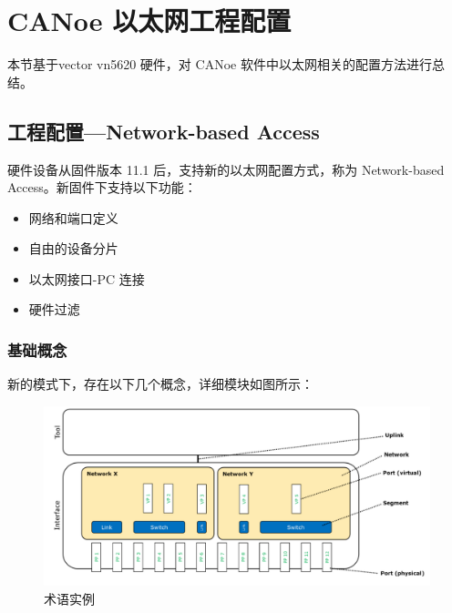 \section{CANoe 以太网工程配置}
本节基于vector vn5620 硬件，对 CANoe 软件中以太网相关的配置方法进行总结。

\subsection{工程配置---Network-based Access}
硬件设备从固件版本 11.1 后，支持新的以太网配置方式，称为 Network-based Access。新固件下支持以下功能：

\begin{itemize}
    \item 网络和端口定义
    \item 自由的设备分片
    \item 以太网接口-PC 连接
    \item 硬件过滤
\end{itemize}
\subsubsection{基础概念}
新的模式下，存在以下几个概念，详细模块如图所示：

\begin{figure}[ht]
    \centering
    \includegraphics[scale=0.7]{pic/Snipaste_2021-10-29_09-46-43.png}
    \caption{术语实例}
    \label{fig:new_terms}
\end{figure}

